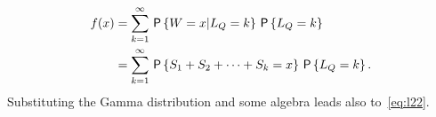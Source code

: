 \documentclass[queueing-book.tex]{subfiles}
\begin{document}
\begin{align*}
f(x)
&= \sum_{k=1}^\infty \P{W = x | L_Q = k}\P{L_Q = k } \\
&= \sum_{k=1}^\infty \P{S_1 + S_2 + \cdots + S_k = x}\P{L_Q = k }.
\end{align*}
Substituting the Gamma distribution and some algebra leads also to~\cref{eq:l22}.
\end{document}
